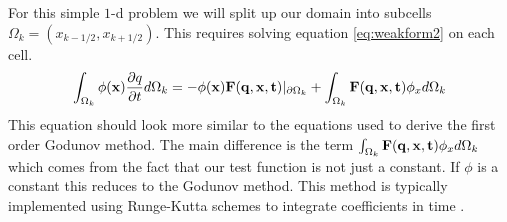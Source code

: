 \documentclass[10]{amsart}
\begin{document}
 For this simple $1$-d problem we will split up our domain into subcells $\Omega_k=(x_{k-1/2},x_{k+1/2})$. This
 requires solving equation \eqref{eq:weakform2} on each cell.
%  
%  
%  
 \begin{equation}
\int_{\Omega_k} \phi({\bf x}) \frac{\partial q}{\partial t} d\Omega_k =-\phi({\bf x}) {\bf F(q,x,t)} |_{\partial \Omega_k}
 +\int_{\Omega_k}{\bf F(q,x,t)} \phi_x d\Omega_k \label{eq:weakform2}
 \end{equation}
 This equation should look more similar to the equations used to derive the first order Godunov method. The main difference
 is the term $\int_{\Omega_k}{\bf F(q,x,t)}\phi_x d\Omega_k$ which comes from the fact that our
 test function is not just a constant. If $\phi$ is a constant this reduces to the Godunov method.
 This method is typically implemented using Runge-Kutta schemes to integrate coefficients
 in time \cite{cockburn1998runge}.
\end{document}
